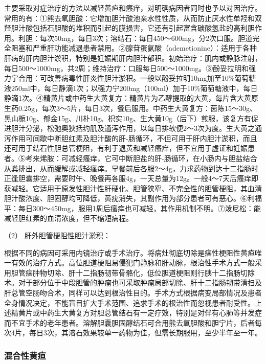 主要采取对症治疗的方法以减轻黄疸和瘙痒，对明确病因者同时也予以对因治疗。常用的有：①熊去氧胆酸：它增加胆汁酸池亲水性性质，从而防止厌水性单羟和双羟胆汁酸包括石胆酸的堆积而引起的膜损害，它还有引起富含碳酸氢盐的高利胆作用。利胆：每次50mg，每日3次；溶结石：每日450～600mg，分2次口服。胆道完全阻塞和严重肝功能减退患者禁用。②腺苷蛋氨酸（ademetionine）：适用于各种肝病的肝内胆汁淤积，特别是妊娠期肝内胆汁郁积。初始治疗：肌内或静脉注射，每日500～1000mg，共2周；维持治疗：口服每日500～1000mg。③酚妥拉明和强力宁合用：可改善病毒性肝炎性胆汁淤积。一般以酚妥拉明10mg加至10\%葡萄糖液250ml中，每日静滴1次；以强力宁200mg（100ml）加于10\%葡萄糖液中，每日静滴1次。④精黄片或中药生大黄复方：精黄片为乙醇提取的大黄，每片含大黄原生药0.25g，每次3～5片，每日3次，餐后服用。中药生大黄复方：茵陈15～30g、黑山栀10g、郁金15g、川朴10g、枳实10g、生大黄10g（后下）煎服，该复方有促进胆汁分泌，松弛奥狄括约肌及通泻作用，以每日排软便2～3次为度。生大黄之通泻作用可间歇中断胆红素及胆汁酸的肝-肠循环，不但可用于肝内胆汁淤积，而且还可用于结石性胆总管梗阻，有利于退黄和减轻瘙痒，但不宜用于虚证和妊娠患者。⑤考来烯胺：可减轻瘙痒，它可中断胆盐的肝-肠循环，在小肠内与胆盐结合从粪排出，从而缓解或减轻瘙痒。早餐前后各服2～4g，力求药物到达十二指肠时正逢胆囊排空，需要时午、晚餐再各服4g，一天总量为12g。一般4～7天后瘙痒即获减轻。它适用于原发性胆汁性肝硬化、胆管狭窄、不完全性的胆管梗阻，其血清胆汁酸浓度、胆固醇均可降低，黄疣消失，其副作用为部分患者可有恶心。⑥利福平：每日300～450mg，服用1周后瘙痒也可减轻，其作用机制不明。⑦泼尼松：能减轻胆红素的血清浓度，但不缩短病程。

\hypertarget{text00039.htmlux5cux23CHP1-16-4-4-3-2}{}
（2） 肝外胆管梗阻性胆汁淤积：

根据不同的病因可采用内镜治疗或手术治疗。将病灶彻底切除是癌性梗阻性黄疸唯一有效的治疗方式。高位胆道梗阻易侵犯门静脉和肝动脉，根治性手术方式一般采用胆管癌肿物切除、肝十二指肠韧带骨骼化，低位胆道梗阻则行胰十二指肠切除术。对于部分位于中段胆管的肿瘤也可采取肿瘤局部切除、肝十二指肠韧带清扫及肝总管空肠吻合术，同样可以达到根治性目的。手术方式根据病变局部情况及患者全身情况决定，不能盲目扩大手术范围、追求手术的根治性而忽视患者耐受性。上述精黄片或中药生大黄复方对胆总管结石有一定疗效，特别是对伴有心肺等并发症而不宜手术的老年患者。溶解胆囊胆固醇结石可合用熊去氧胆酸和胆宁片，后者每次4片，每日3次，其溶石效果较单一药物为佳，但需长期服用，至少半年至一年。

\subsubsection{混合性黄疸}

